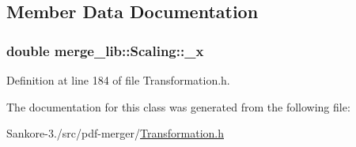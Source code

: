 \subsection{Member Data Documentation}
\hypertarget{classmerge__lib_1_1_scaling_ad657f6cb9bab659781d4691f11e95c32}{
\subsubsection[{\-\_\-x}]{\setlength{\rightskip}{0pt plus 5cm}double merge\-\_\-lib\-::\-Scaling\-::\-\_\-x\hspace{0.3cm}{\ttfamily [protected]}}}\label{d0/d83/classmerge__lib_1_1_scaling_ad657f6cb9bab659781d4691f11e95c32}


Definition at line 184 of file Transformation.\-h.



The documentation for this class was generated from the following file\-:\begin{DoxyCompactItemize}
\item 
Sankore-\/3./src/pdf-\/merger/\hyperlink{_transformation_8h}{Transformation.\-h}\end{DoxyCompactItemize}
